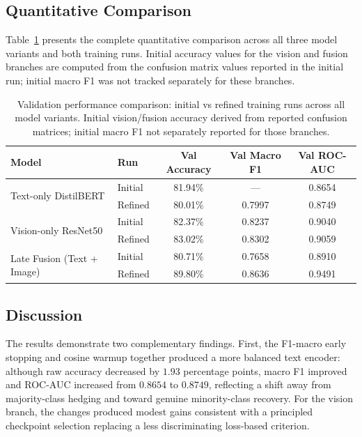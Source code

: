 \documentclass[11pt,letterpaper]{article}
\begin{document}
\subsection{Quantitative Comparison}
Table~\ref{tab:model_comparison_full} presents the complete quantitative comparison across all three model variants and both training runs. Initial accuracy values for the vision and fusion branches are computed from the confusion matrix values reported in the initial run; initial macro F1 was not tracked separately for these branches.

\begin{table}[H]
\centering
\caption{Validation performance comparison: initial vs refined training runs across all model variants. Initial vision/fusion accuracy derived from reported confusion matrices; initial macro F1 not separately reported for those branches.}
\label{tab:model_comparison_full}
\begin{tabular}{@{}llccc@{}}
\toprule
\textbf{Model} & \textbf{Run} & \textbf{Val Accuracy} & \textbf{Val Macro F1} & \textbf{Val ROC-AUC} \\ \midrule
\multirow{2}{*}{Text-only DistilBERT}   & Initial & 81.94\% & ---    & 0.8654 \\
                                         & Refined & 80.01\% & 0.7997 & 0.8749 \\ \midrule
\multirow{2}{*}{Vision-only ResNet50}   & Initial & 82.37\% & 0.8237 & 0.9040 \\
                                         & Refined & 83.02\% & 0.8302 & 0.9059 \\ \midrule
\multirow{2}{*}{Late Fusion (Text + Image)} & Initial & 80.71\% & 0.7658 & 0.8910 \\
                                             & Refined & 89.80\% & 0.8636 & 0.9491 \\ \bottomrule
\end{tabular}
\end{table}

\subsection{Discussion}
The results demonstrate two complementary findings. First, the F1-macro early stopping and cosine warmup together produced a more balanced text encoder: although raw accuracy decreased by $1.93$ percentage points, macro F1 improved and ROC-AUC increased from $0.8654$ to $0.8749$, reflecting a shift away from majority-class hedging and toward genuine minority-class recovery. For the vision branch, the changes produced modest gains consistent with a principled checkpoint selection replacing a less discriminating loss-based criterion.
\end{document}
